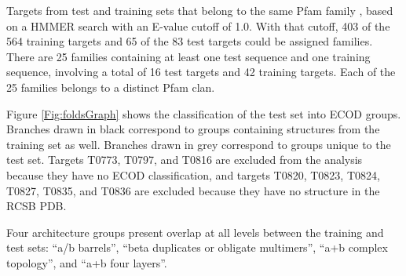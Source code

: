 \documentclass[letter,10pt]{article}
\begin{document}
\begin{table}[H]
\begin{center}
\caption{Targets from test and training sets that belong to the same Pfam
family \cite{finn2016pfam}, based on a HMMER search \cite{finn2015hmmer} with an
E-value cutoff of 1.0. With that cutoff, 403 of the 564 training
targets and 65 of the 83 test targets could be assigned
families. There are 25 families containing at least one test sequence
and one training sequence, involving a total of 16 test targets and 42
training targets. Each of the 25 families belongs to a distinct Pfam
clan.}
%
\label{Tbl:SharedPfam}
\end{center}
\end{table}


Figure \ref{Fig:foldsGraph} shows the classification of the test set
into ECOD groups. Branches drawn in black correspond to groups
containing structures from the training set as well. Branches drawn in
grey correspond to groups unique to the test set. Targets T0773,
T0797, and T0816 are excluded from the analysis because they have no
ECOD classification, and targets T0820, T0823, T0824, T0827, T0835,
and T0836 are excluded because they have no structure in the RCSB PDB.

Four architecture groups present overlap at all levels between the
training and test sets: ``a/b barrels'', ``beta duplicates or obligate
multimers'', ``a+b complex topology'', and ``a+b four layers''.
\end{document}
